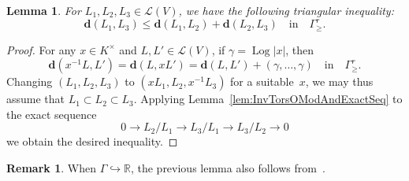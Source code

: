\documentclass[11pt]{article}
\newtheorem{lemm}[theo]{Lemma}
\theoremstyle{definition}
\newtheorem{rema}[theo]{Remark}
\numberwithin{equation}{section}
\numberwithin{figure}{section}
\numberwithin{table}{section}
\DeclareMathOperator{\Log}{Log}
\begin{document}
\begin{lemm}\label{lem:triangIneq}
For $L_{1},L_{2},L_{3}\in\mathcal{L}(V)$, we have the following triangular inequality:
\[
\mathbf{d}(L_{1},L_{3})\leq\mathbf{d}(L_{1},L_{2})+\mathbf{d}(L_{2},L_{3})\quad\text{in}\quad\Gamma_{\geq}^{r}.
\]
\end{lemm}

\begin{proof}
For any $x\in K^{\times}$ and $L,L'\in\mathcal{L}(V)$, if $\gamma=\Log\left|x\right|$, then
\[
\mathbf{d}(x^{-1}L,L')=\mathbf{d}(L,xL')=\mathbf{d}(L,L')+(\gamma,\dots,\gamma)\quad\text{in}\quad\Gamma_{\geq}^{r}.
\]
Changing $(L_{1},L_{2},L_{3})$ to $(xL_{1},L_{2},x^{-1}L_{3})$ for a suitable~$x$, we may thus assume that $L_{1}\subset L_{2}\subset L_{3}$. Applying Lemma~\ref{lem:InvTorsOModAndExactSeq} to the exact sequence
\[
0\rightarrow L_{2}/L_{1}\rightarrow L_{3}/L_{1}\rightarrow L_{3}/L_{2}\rightarrow0
\]
we obtain the desired inequality.
\end{proof}

\begin{rema}
When $\Gamma\hookrightarrow\mathbb{R}$, the previous lemma also follows from~\cite[5.2.8 \& 6.1]{Co14}.
\end{rema}
\end{document}
